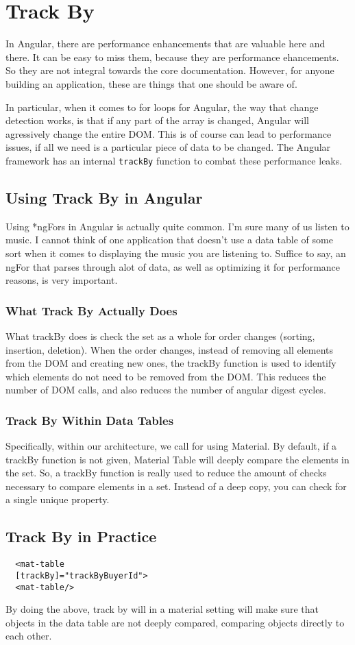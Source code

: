 \chapter{ Track By }
In Angular, there are performance enhancements that are valuable here and there.
It can be easy to miss them, because they are performance ehancements. So they are not integral towards the core documentation. However, for anyone building an application, these are things that one should be aware of. 

In particular, when it comes to for loops for Angular, the way that change detection works, is that if any part of the array is changed, Angular will agressively change the entire DOM. This is of course can lead to performance issues, if all we need is a particular piece of data to be changed. The Angular framework has an internal \lstinline{trackBy} function to combat these performance leaks. 

\section{ Using Track By in Angular }
Using *ngFors in Angular is actually quite common. I'm sure many of us listen
to music. I cannot think of one application that doesn't use a data table of
some sort when it comes to displaying the music you are listening to. Suffice
to say, an ngFor that parses through alot of data, as well as optimizing it for
performance reasons, is very important.

\subsection{ What Track By Actually Does }

What trackBy does is check the set as a whole for order changes (sorting,
insertion, deletion). When the order changes, instead of removing all elements
from the DOM and creating new ones, the trackBy function is used to identify
which elements do not need to be removed from the DOM. This reduces the number
of DOM calls, and also reduces the number of angular digest cycles.


\subsection{ Track By Within Data Tables }
Specifically, within our architecture, we call for using Material. By default,
if a trackBy function is not given, Material Table will deeply compare the
elements in the set. So, a trackBy function is really used to reduce the amount
of checks necessary to compare elements in a set. Instead of a deep copy, you
can check for a single unique property.

\section{ Track By in Practice }
\begin{lstlisting}
  <mat-table
  [trackBy]="trackByBuyerId">
  <mat-table/>
\end{lstlisting}

By doing the above, track by will in a material setting will make sure that
objects in the data table are not deeply compared, comparing objects directly to
each other. 
